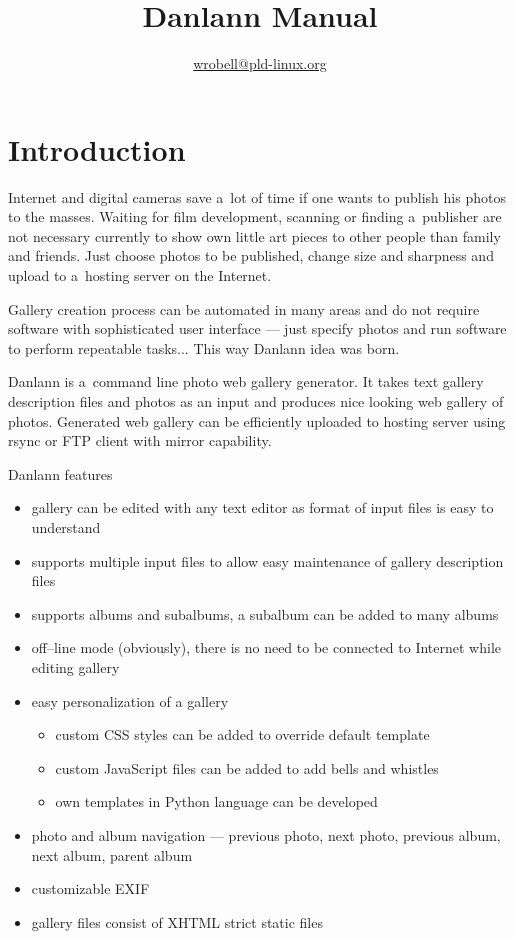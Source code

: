 \documentclass{article}
\title{Danlann Manual}
\author{\url{wrobell@pld-linux.org}}
\begin{document}
\maketitle

\tableofcontents

\section{Introduction}
Internet and digital cameras save a~lot of time
if one wants to publish his photos to the masses. Waiting for film
development, scanning or finding a~publisher are not necessary currently to show
own little art pieces to other people than family and friends. Just choose
photos to be published, change size and sharpness and
upload to a~hosting server on the Internet.

Gallery creation process can be automated in many areas and do not require
software with sophisticated user interface --- just specify photos and run
software to perform repeatable tasks... This way Danlann idea was born.

Danlann is a~command line photo web gallery generator.
It takes text gallery description files and photos as an input and produces 
nice looking web gallery of photos. Generated web gallery can be
efficiently uploaded to hosting server using rsync or FTP client with
mirror capability.

Danlann features
\begin{itemize}
\itemsep0pt
\item gallery can be edited with any text editor as format of input files
    is easy to understand
\item supports multiple input files to allow easy maintenance of gallery
    description files
\item supports albums and subalbums, a subalbum can be added to many albums
\item off--line mode (obviously), there is no need to be connected to Internet while
    editing gallery
\item easy personalization of a gallery
    \begin{itemize}
    \itemsep0pt
    \item custom CSS styles can be added to override default template
    \item custom JavaScript files can be added to add bells and whistles
    \item own templates in Python language can be developed
    \end{itemize}
\item photo and album navigation --- previous photo, next photo, previous
    album, next album, parent album
\item customizable EXIF
\item gallery files consist of XHTML strict static files
\end{itemize}
\end{document}
